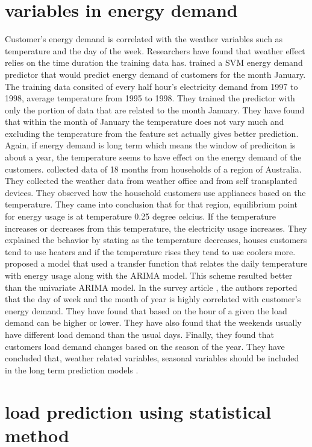\section{variables in energy demand}
Customer's energy demand is correlated with the weather variables such as temperature and the day of the week. Researchers have found that weather effect relies on the time duration the training data has. \cite{chen2004load} trained a SVM energy demand predictor that would predict energy demand of customers for the month January. The training data consited of every half hour's electricity demand from 1997 to 1998, average temperature from 1995 to 1998. They trained the predictor with only the portion of data that are related to the month January. They have found that within the month of January the temperature does not vary much and excluding the temperature from the feature set actually gives better prediction. Again, if energy demand is long term which means the window of prediciton is about a year, the temperature seems to have effect on the energy demand of the customers. \cite{hart2004weather} collected data of 18 months from households of a region of Australia. They collected the weather data from weather office and from self transplanted devices. They observed how the household customers use appliances based on the temperature. They came into conclusion that for that region, equilibrium point for energy usage is at temperature 0.25 degree celcius. If the temperature increases or decreases from this temperature, the electricity usage increases. They explained the behavior by stating as the temperature decreases, houses customers tend to use heaters and if the temperature rises they tend to use coolers more. \cite{cho1995customer} proposed a model that used a transfer function that relates the daily temperature with energy usage along with the ARIMA model. This scheme resulted better than the univariate ARIMA model. 
In the survey article \cite{hahn2009electric}, the authors reported that the day of week and the month of year is highly correlated with customer's energy demand. They have found that based on the hour of a given the load demand can be higher or lower. They have also found that the weekends usually have different load demand than the usual days. Finally, they found that customers load demand changes based on the season of the year. They have concluded that, weather related variables, seasonal variables should be included in the long term prediction models .


\section{load prediction using statistical method}

